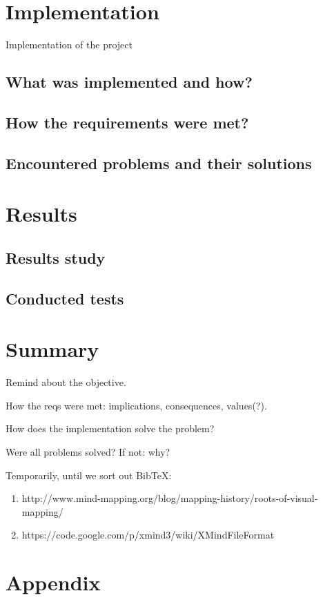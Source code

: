 \documentclass[american]{bsc}
\begin{document}
\chapter{Implementation}
\label{chap:implementation}

Implementation of the project

\section{What was implemented and how?}
\label{implwhat}

\section{How the requirements were met?}
\label{implrequirements}

\section{Encountered problems and their solutions}
\label{implproblems}

\chapter{Results}
\label{chap:results}

\section{Results study}
\label{sec:resstudy}

\section{Conducted tests}
\label{sec:tests}

\chapter{Summary}
\label{chap:summary}

Remind about the objective.

How the reqs were met: implications, consequences, values(?).

How does the implementation solve the problem?

Were all problems solved? If not: why?




Temporarily, until we sort out BibTeX:

\begin{enumerate}
	\item http://www.mind-mapping.org/blog/mapping-history/roots-of-visual-mapping/
	\item https://code.google.com/p/xmind3/wiki/XMindFileFormat
\end{enumerate}

\appendix

\chapter{Appendix}
\label{chap:appendix}
\end{document}
